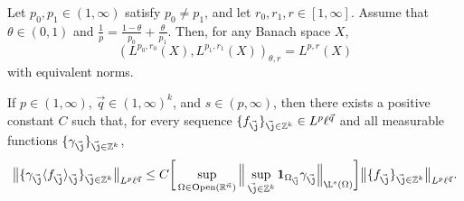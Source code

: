 \documentclass[10pt,a4paper]{amsart}
\newcommand{\Avee}[2]{\langle#1\rangle_{#2}}
\newcommand{\Open}{\mathrm{Open}}
\newcommand{\R}{\mathbb R}
\newcommand{\aveL}{\textit{\L}}
\newcommand{\bNorm}[2]{\big\|#1\big\|_{#2}}
\newcommand{\one}{\mathbf{1}}
\newcommand{\vj}{\vec{\textit{\j}}}
\newcommand{\vn}{\vec n}
\newcommand{\vq}{\vec q}
\begin{document}
\begin{lemma}\label{interp}
Let $p_0,p_1\in(1,\infty)$ satisfy $p_0\neq p_1$,
and let $r_0,r_1,r\in[1,\infty]$.
Assume that $\theta\in(0,1)$ and $\frac 1p=\frac{1-\theta}{p_0}+\frac{\theta}{p_1}$.
Then, for any Banach space $X$,
\begin{equation*}
(L^{p_0,r_0}(X),L^{p_1,r_1}(X))_{\theta,r}=L^{p,r}(X)
\end{equation*}
with equivalent norms.
\end{lemma}

\begin{lemma}\label{carl >1}
If $p\in(1,\infty)$, $\vq\in(1,\infty)^k$, and $s\in(p,\infty)$,
then there exists a positive constant $C$ such that,
for every sequence $\{f_{\vj}\}_{\vj\in\mathbb Z^k}\in L^p\ell^{\vq}$ and
all measurable functions $\{\gamma_{\vj}\}_{\vj\in\mathbb Z^k}$,
\begin{equation}\label{carl >1eq}
\bNorm{\{\gamma_{\vj}\Avee{f_{\vj}}{\vj}\}_{\vj\in\mathbb Z^k}}{L^p\ell^{\vq}}
\leq C
\bigg[\sup_{\Omega\in\Open(\R^{\vn})}\Big\|\sup_{\vj\in\mathbb Z^k}\one_{\Omega_{\vj}}\gamma_{\vj}\Big\|_{\aveL^s(\Omega)}\bigg]
\bNorm{\{ f_{\vj}\}_{\vj\in\mathbb Z^k}}{L^p\ell^{\vq}}.
\end{equation}
\end{lemma}
\end{document}
